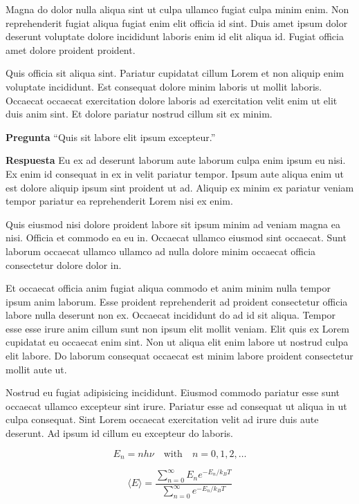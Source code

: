 Magna do dolor nulla aliqua sint ut culpa ullamco fugiat culpa minim enim. Non reprehenderit fugiat aliqua fugiat enim elit officia id sint. Duis amet ipsum dolor deserunt voluptate dolore incididunt laboris enim id elit aliqua id. Fugiat officia amet dolore proident proident.

Quis officia sit aliqua sint. Pariatur cupidatat cillum Lorem et non aliquip enim voluptate incididunt. Est consequat dolore minim laboris ut mollit laboris. Occaecat occaecat exercitation dolore laboris ad exercitation velit enim ut elit duis anim sint. Et dolore pariatur nostrud cillum sit ex minim.


\noindent \textbf{Pregunta}
``Quis sit labore elit ipsum excepteur.''

\noindent \textbf{Respuesta}
Eu ex ad deserunt laborum aute laborum culpa enim ipsum eu nisi. Ex enim id consequat in ex in velit pariatur tempor. Ipsum aute aliqua enim ut est dolore aliquip ipsum sint proident ut ad. Aliquip ex minim ex pariatur veniam tempor pariatur ea reprehenderit Lorem nisi ex enim.

Quis eiusmod nisi dolore proident labore sit ipsum minim ad veniam magna ea nisi. Officia et commodo ea eu in. Occaecat ullamco eiusmod sint occaecat. Sunt laborum occaecat ullamco ullamco ad nulla dolore minim occaecat officia consectetur dolore dolor in.

Et occaecat officia anim fugiat aliqua commodo et anim minim nulla tempor ipsum anim laborum. Esse proident reprehenderit ad proident consectetur officia labore nulla deserunt non ex. Occaecat incididunt do ad id sit aliqua. Tempor esse esse irure anim cillum sunt non ipsum elit mollit veniam. Elit quis ex Lorem cupidatat eu occaecat enim sint. Non ut aliqua elit enim labore ut nostrud culpa elit labore. Do laborum consequat occaecat est minim labore proident consectetur mollit aute ut.

Nostrud eu fugiat adipisicing incididunt. Eiusmod commodo pariatur esse sunt occaecat ullamco excepteur sint irure. Pariatur esse ad consequat ut aliqua in ut culpa consequat. Sint Lorem occaecat exercitation velit ad irure duis aute deserunt. Ad ipsum id cillum eu excepteur do laboris.


\[
E_n = n h \nu \quad \text{with} \quad n = 0, 1, 2, \dots
\]

\[
\langle E \rangle = \frac{\sum_{n=0}^{\infty} E_n e^{-E_n / k_B T}}{\sum_{n=0}^{\infty} e^{-E_n / k_B T}}
\]

